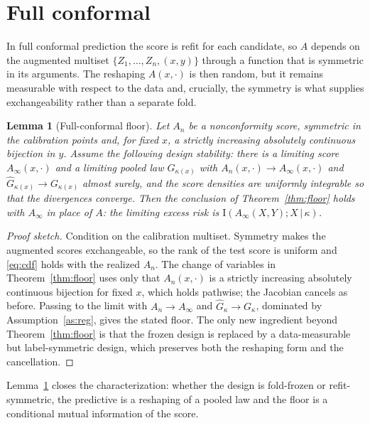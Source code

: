 \documentclass[11pt]{article}
\newtheorem{lemma}[theorem]{Lemma}
\theoremstyle{definition}
\theoremstyle{remark}
\newcommand{\I}{\mathrm{I}}
\newcommand{\given}{\,|\,}
\begin{document}
\section{Full conformal}\label{sec:full}

In full conformal prediction the score is refit for each candidate, so $A$ depends on
the augmented multiset $\{Z_1,\dots,Z_n,(x,y)\}$ through a function that is symmetric in
its arguments. The reshaping $A(x,\cdot)$ is then random, but it remains measurable with
respect to the data and, crucially, the symmetry is what supplies exchangeability rather
than a separate fold.

\begin{lemma}[Full-conformal floor]\label{lem:full}
Let $A_n$ be a nonconformity score, symmetric in the calibration points and, for fixed
$x$, a strictly increasing absolutely continuous bijection in $y$. Assume the following
\emph{design stability}: there is a limiting score $A_\infty(x,\cdot)$ and a limiting
pooled law $G_{\kappa(x)}$ with $A_n(x,\cdot)\to A_\infty(x,\cdot)$ and $\widehat
G_{\kappa(x)}\to G_{\kappa(x)}$ almost surely, and the score densities are uniformly
integrable so that the divergences converge. Then the conclusion of
Theorem~\ref{thm:floor} holds with $A_\infty$ in place of $A$: the limiting excess
risk is $\I(A_\infty(X,Y);X\given\kappa)$.
\end{lemma}

\begin{proof}[Proof sketch]
Condition on the calibration multiset. Symmetry makes the augmented scores exchangeable,
so the rank of the test score is uniform and \eqref{eq:cdf} holds with the realized
$A_n$. The change of variables in Theorem~\ref{thm:floor} uses only that $A_n(x,\cdot)$
is a strictly increasing absolutely continuous bijection for fixed $x$, which holds
pathwise; the Jacobian cancels as before. Passing to the limit with $A_n \to A_\infty$
and $\widehat G_{\kappa} \to G_\kappa$, dominated by Assumption~\ref{as:reg}, gives the
stated floor. The only new ingredient beyond Theorem~\ref{thm:floor} is that the frozen
design is replaced by a data-measurable but label-symmetric design, which preserves both
the reshaping form and the cancellation.
\end{proof}

Lemma~\ref{lem:full} closes the characterization: whether the design is fold-frozen or
refit-symmetric, the predictive is a reshaping of a pooled law and the floor is a
conditional mutual information of the score.
\end{document}

